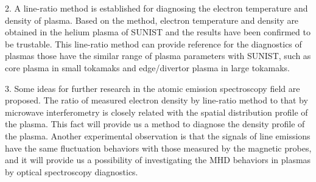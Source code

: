 \begin{eabstract}
2. A line-ratio method is established for diagnosing the electron temperature and density of plasma. Based on the method, electron temperature and density are obtained in the helium plasma of SUNIST and the results have been confirmed to be trustable. This line-ratio method can provide reference for the diagnostics of plasmas those have the similar range of plasma parameters with SUNIST, such as core plasma in small tokamaks and edge/divertor plasma in large tokamaks.

3. Some ideas for further research in the atomic emission spectroscopy field are proposed. The ratio of measured electron density by line-ratio method to that by microwave interferometry is closely related with the spatial distribution profile of the plasma. This fact will provide us a method to diagnose the density profile of the plasma. Another experimental observation is that the signals of line emissions have the same fluctuation behaviors with those measured by the magnetic probes, and it will provide us a possibility of investigating the MHD behaviors in plasmas by optical spectroscopy diagnostics.
\end{eabstract}


